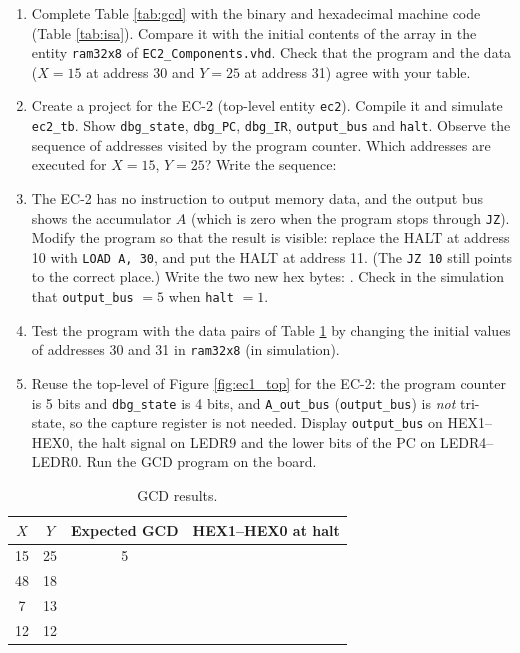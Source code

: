 \documentclass{article}
\begin{document}
\begin{enumerate}
    \item Complete Table \ref{tab:gcd} with the binary and hexadecimal machine code (Table \ref{tab:isa}). Compare it with the initial contents of the array in the entity \texttt{ram32x8} of \texttt{EC2\_Components.vhd}. Check that the program and the data ($X = 15$ at address 30 and $Y = 25$ at address 31) agree with your table.
    \item Create a project for the EC-2 (top-level entity \texttt{ec2}). Compile it and simulate \texttt{ec2\_tb}. Show \texttt{dbg\_state}, \texttt{dbg\_PC}, \texttt{dbg\_IR}, \texttt{output\_bus} and \texttt{halt}. Observe the sequence of addresses visited by the program counter. Which addresses are executed for $X = 15$, $Y = 25$? Write the sequence: \underline{\hspace{9cm}}
    \item The EC-2 has no instruction to output memory data, and the output bus shows the accumulator $A$ (which is zero when the program stops through \texttt{JZ}). Modify the program so that the result is visible: replace the HALT at address 10 with \texttt{LOAD A, 30}, and put the HALT at address 11. (The \texttt{JZ 10} still points to the correct place.) Write the two new hex bytes: \underline{\hspace{3cm}}. Check in the simulation that \texttt{output\_bus} $= 5$ when \texttt{halt} $= 1$.
    \item Test the program with the data pairs of Table \ref{tab:gcd_res} by changing the initial values of addresses 30 and 31 in \texttt{ram32x8} (in simulation).
    \item Reuse the top-level of Figure \ref{fig:ec1_top} for the EC-2: the program counter is 5 bits and \texttt{dbg\_state} is 4 bits, and \texttt{A\_out\_bus} (\texttt{output\_bus}) is \emph{not} tri-state, so the capture register is not needed. Display \texttt{output\_bus} on HEX1--HEX0, the halt signal on LEDR9 and the lower bits of the PC on LEDR4--LEDR0. Run the GCD program on the board.
\end{enumerate}

\begin{table}[H]
    \centering
    \begin{tabular}{|c|c|c|c|}
        \hline
        $X$ & $Y$ & \textbf{Expected GCD} & \textbf{HEX1--HEX0 at halt} \\
        \hline
        15 & 25 & 5 & \\ \hline
        48 & 18 & & \\ \hline
        7 & 13 & & \\ \hline
        12 & 12 & & \\ \hline
    \end{tabular}
    \caption{GCD results.}
    \label{tab:gcd_res}
\end{table}
\end{document}
